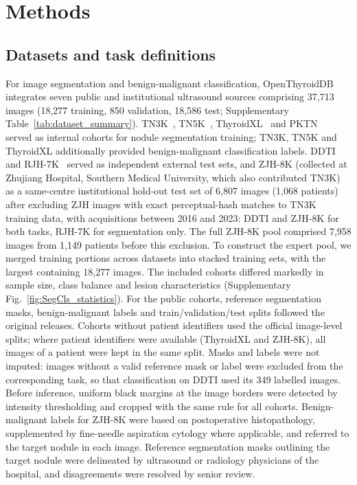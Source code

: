 \documentclass[fleqn,10pt]{wlscirep}
\begin{document}
\section{Methods}

\subsection{Datasets and task definitions}
For image segmentation and benign-malignant classification, OpenThyroidDB integrates seven public and institutional ultrasound sources comprising 37{,}713 images (18{,}277 training, 850 validation, 18{,}586 test; Supplementary Table~\ref{tab:dataset_summary}). TN3K~\cite{gong2021multi}, TN5K~\cite{zhang2025tn5000}, ThyroidXL~\cite{duong2025thyroidxl} and PKTN~\cite{sun2025clip} served as internal cohorts for nodule segmentation training; TN3K, TN5K and ThyroidXL additionally provided benign-malignant classification labels. DDTI~\cite{pedraza2015open} and RJH-7K~\cite{shusharina2021segmentation} served as independent external test sets, and ZJH-8K (collected at Zhujiang Hospital, Southern Medical University, which also contributed TN3K) as a same-centre institutional hold-out test set of 6{,}807 images (1{,}068 patients) after excluding ZJH images with exact perceptual-hash matches to TN3K training data, with acquisitions between 2016 and 2023: DDTI and ZJH-8K for both tasks, RJH-7K for segmentation only. The full ZJH-8K pool comprised 7,958 images from 1,149 patients before this exclusion. To construct the expert pool, we merged training portions across datasets into stacked training sets, with the largest containing 18,277 images. The included cohorts differed markedly in sample size, class balance and lesion characteristics (Supplementary Fig.~\ref{fig:SegCls_statistics}). For the public cohorts, reference segmentation masks, benign-malignant labels and train/validation/test splits followed the original releases. Cohorts without patient identifiers used the official image-level splits; where patient identifiers were available (ThyroidXL and ZJH-8K), all images of a patient were kept in the same split. Masks and labels were not imputed: images without a valid reference mask or label were excluded from the corresponding task, so that classification on DDTI used its 349 labelled images. Before inference, uniform black margins at the image borders were detected by intensity thresholding and cropped with the same rule for all cohorts. Benign-malignant labels for ZJH-8K were based on postoperative histopathology, supplemented by fine-needle aspiration cytology where applicable, and referred to the target nodule in each image. Reference segmentation masks outlining the target nodule were delineated by ultrasound or radiology physicians of the hospital, and disagreements were resolved by senior review.
\end{document}

